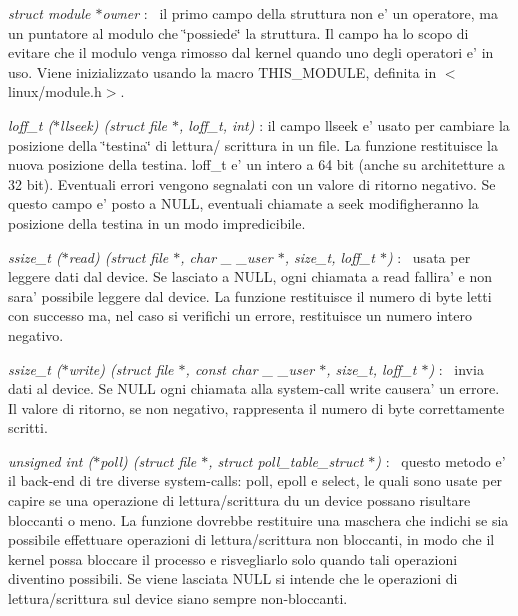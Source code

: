 \begin{DoxyItemize}
\item {\itshape struct module $\ast$owner} \+:~\newline
 il primo campo della struttura non e' un operatore, ma un puntatore al modulo che \char`\"{}possiede\char`\"{} la struttura. Il campo ha lo scopo di evitare che il modulo venga rimosso dal kernel quando uno degli operatori e' in uso. Viene inizializzato usando la macro T\+H\+I\+S\+\_\+\+M\+O\+D\+U\+L\+E, definita in $<$linux/module.\+h$>$.
\item {\itshape loff\+\_\+t ($\ast$llseek) (struct file $\ast$, loff\+\_\+t, int)} \+: il campo llseek e' usato per cambiare la posizione della \char`\"{}testina\char`\"{} di lettura/ scrittura in un file. La funzione restituisce la nuova posizione della testina. loff\+\_\+t e' un intero a 64 bit (anche su architetture a 32 bit). Eventuali errori vengono segnalati con un valore di ritorno negativo. Se questo campo e' posto a N\+U\+L\+L, eventuali chiamate a seek modifigheranno la posizione della testina in un modo impredicibile.
\item {\itshape ssize\+\_\+t ($\ast$read) (struct file $\ast$, char \+\_\+ \+\_\+user $\ast$, size\+\_\+t, loff\+\_\+t $\ast$)} \+:~\newline
 usata per leggere dati dal device. Se lasciato a N\+U\+L\+L, ogni chiamata a read fallira' e non sara' possibile leggere dal device. La funzione restituisce il numero di byte letti con successo ma, nel caso si verifichi un errore, restituisce un numero intero negativo.
\item {\itshape ssize\+\_\+t ($\ast$write) (struct file $\ast$, const char \+\_\+ \+\_\+user $\ast$, size\+\_\+t, loff\+\_\+t $\ast$)} \+:~\newline
 invia dati al device. Se N\+U\+L\+L ogni chiamata alla system-\/call write causera' un errore. Il valore di ritorno, se non negativo, rappresenta il numero di byte correttamente scritti.
\item {\itshape unsigned int ($\ast$poll) (struct file $\ast$, struct poll\+\_\+table\+\_\+struct $\ast$)} \+:~\newline
 questo metodo e' il back-\/end di tre diverse system-\/calls\+: poll, epoll e select, le quali sono usate per capire se una operazione di lettura/scrittura du un device possano risultare bloccanti o meno. La funzione dovrebbe restituire una maschera che indichi se sia possibile effettuare operazioni di lettura/scrittura non bloccanti, in modo che il kernel possa bloccare il processo e risvegliarlo solo quando tali operazioni diventino possibili. Se viene lasciata N\+U\+L\+L si intende che le operazioni di lettura/scrittura sul device siano sempre non-\/bloccanti.

\end{DoxyItemize}
